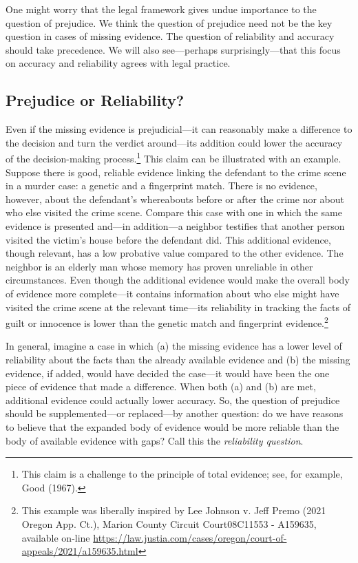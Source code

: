 \documentclass[
  10pt,
  dvipsnames,enabledeprecatedfontcommands]{scrartcl}
\begin{document}
\label{sec:prejudice-reliability} One might worry that the legal
framework gives undue importance to the question of prejudice. We think
the question of prejudice need not be the key question in cases of
missing evidence. The question of reliability and accuracy should take
precedence. We will also see---perhaps surprisingly---that this focus on
accuracy and reliability agrees with legal practice.

\hypertarget{prejudice-or-reliability}{%
\subsection{Prejudice or Reliability?}\label{prejudice-or-reliability}}

Even if the missing evidence is prejudicial---it can reasonably make a
difference to the decision and turn the verdict around---its addition
could lower the accuracy of the decision-making process.\footnote{This
  claim is a challenge to the principle of total evidence; see, for
  example, Good (1967).} This claim can be illustrated with an example.
Suppose there is good, reliable evidence linking the defendant to the
crime scene in a murder case: a genetic and a fingerprint match. There
is no evidence, however, about the defendant's whereabouts before or
after the crime nor about who else visited the crime scene. Compare this
case with one in which the same evidence is presented and---in
addition---a neighbor testifies that another person visited the victim's
house before the defendant did. This additional evidence, though
relevant, has a low probative value compared to the other evidence. The
neighbor is an elderly man whose memory has proven unreliable in other
circumstances. Even though the additional evidence would make the
overall body of evidence more complete---it contains information about
who else might have visited the crime scene at the relevant time---its
reliability in tracking the facts of guilt or innocence is lower than
the genetic match and fingerprint evidence.\footnote{This example was
  liberally inspired by Lee Johnson v. Jeff Premo (2021 Oregon App.
  Ct.), Marion County Circuit Court08C11553 - A159635, available on-line
  \url{https://law.justia.com/cases/oregon/court-of-appeals/2021/a159635.html}}

In general, imagine a case in which (a) the missing evidence has a lower
level of reliability about the facts than the already available evidence
and (b) the missing evidence, if added, would have decided the case---it
would have been the one piece of evidence that made a difference. When
both (a) and (b) are met, additional evidence could actually lower
accuracy. So, the question of prejudice should be supplemented---or
replaced---by another question: do we have reasons to believe that the
expanded body of evidence would be more reliable than the body of
available evidence with gaps? Call this the
\textit{reliability question}.
\end{document}
